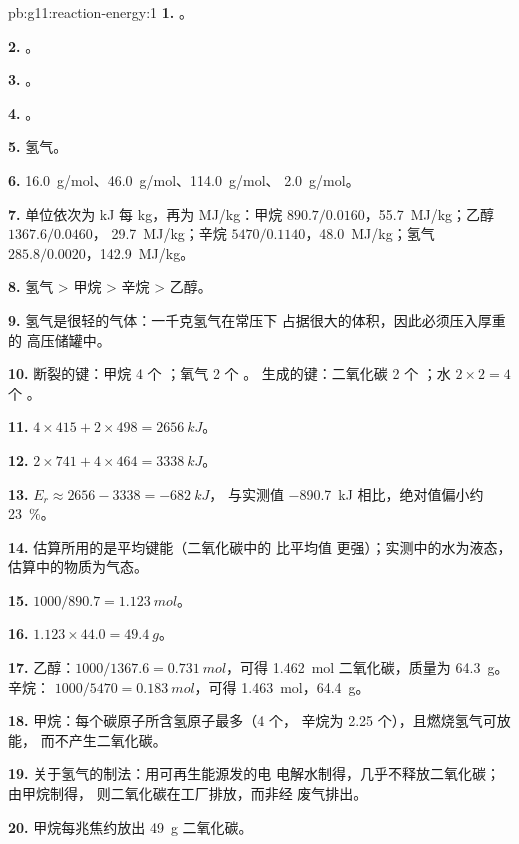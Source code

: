 \begin{solution}{pb:g11:reaction-energy:1}
\textbf{1.} 。

\textbf{2.} 。

\textbf{3.} 。

\textbf{4.} 。

\textbf{5.} 氢气。

\textbf{6.} \qty{16.0}{g/mol}、\qty{46.0}{g/mol}、\qty{114.0}{g/mol}、
\qty{2.0}{g/mol}。

\textbf{7.} 单位依次为 \si{kJ} 每 \si{kg}，再为 \si{MJ/kg}：甲烷
$890.7 / 0.0160$，\qty{55.7}{MJ/kg}；乙醇 $1367.6 / 0.0460$，
\qty{29.7}{MJ/kg}；辛烷 $5470 / 0.1140$，\qty{48.0}{MJ/kg}；氢气
$285.8 / 0.0020$，\qty{142.9}{MJ/kg}。

\textbf{8.} 氢气 > 甲烷 > 辛烷 > 乙醇。

\textbf{9.} 氢气是很轻的气体：一千克氢气在常压下
占据很大的体积，因此必须压入厚重的
高压储罐中。

\textbf{10.} 断裂的键：甲烷 4 个 ；氧气 2 个 。
生成的键：二氧化碳 2 个 ；水 $2 \times 2 = 4$ 个 。

\textbf{11.} $4 \times 415 + 2 \times 498 = \qty{2656}{kJ}$。

\textbf{12.} $2 \times 741 + 4 \times 464 = \qty{3338}{kJ}$。

\textbf{13.} $E_r \approx 2656 - 3338 = \qty{-682}{kJ}$，
与实测值 \qty{-890.7}{kJ} 相比，绝对值偏小约 \qty{23}{\percent}。

\textbf{14.} 估算所用的是平均键能（二氧化碳中的  比平均值
更强）；实测中的水为液态，
估算中的物质为气态。

\textbf{15.} $1000 / 890.7 = \qty{1.123}{mol}$。

\textbf{16.} $1.123 \times 44.0 = \qty{49.4}{g}$。

\textbf{17.} 乙醇：$1000 / 1367.6 = \qty{0.731}{mol}$，可得
\qty{1.462}{mol} 二氧化碳，质量为 \qty{64.3}{g}。辛烷：
$1000 / 5470 = \qty{0.183}{mol}$，可得 \qty{1.463}{mol}，\qty{64.4}{g}。

\textbf{18.} 甲烷：每个碳原子所含氢原子最多（4 个，
辛烷为 2.25 个），且燃烧氢气可放能，
而不产生二氧化碳。

\textbf{19.} 关于氢气的制法：用可再生能源发的电
电解水制得，几乎不释放二氧化碳；由甲烷制得，
则二氧化碳在工厂排放，而非经
废气排出。

\textbf{20.} 甲烷每兆焦约放出
\qty{49}{g} 二氧化碳。
\end{solution}

